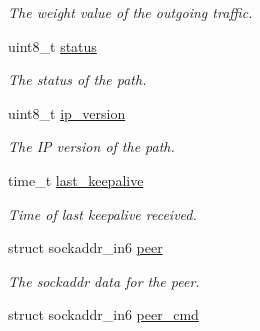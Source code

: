 \begin{DoxyCompactItemize}
\begin{DoxyCompactList}\small\item\em The weight value of the outgoing traffic. \end{DoxyCompactList}\item 
\hypertarget{structpath__struct_ade818037fd6c985038ff29656089758d}{uint8\-\_\-t \hyperlink{structpath__struct_ade818037fd6c985038ff29656089758d}{status}}\label{structpath__struct_ade818037fd6c985038ff29656089758d}

\begin{DoxyCompactList}\small\item\em The status of the path. \end{DoxyCompactList}\item 
\hypertarget{structpath__struct_a8d5dab544aa6ca6d812e1676857b7545}{uint8\-\_\-t \hyperlink{structpath__struct_a8d5dab544aa6ca6d812e1676857b7545}{ip\-\_\-version}}\label{structpath__struct_a8d5dab544aa6ca6d812e1676857b7545}

\begin{DoxyCompactList}\small\item\em The I\-P version of the path. \end{DoxyCompactList}\item 
\hypertarget{structpath__struct_abdffb7370190bb4e10bd049ffa20dfb8}{time\-\_\-t \hyperlink{structpath__struct_abdffb7370190bb4e10bd049ffa20dfb8}{last\-\_\-keepalive}}\label{structpath__struct_abdffb7370190bb4e10bd049ffa20dfb8}

\begin{DoxyCompactList}\small\item\em Time of last keepalive received. \end{DoxyCompactList}\item 
\hypertarget{structpath__struct_a482c5e52f29bbc6839cb9a95b7b2aa4c}{struct sockaddr\-\_\-in6 \hyperlink{structpath__struct_a482c5e52f29bbc6839cb9a95b7b2aa4c}{peer}}\label{structpath__struct_a482c5e52f29bbc6839cb9a95b7b2aa4c}

\begin{DoxyCompactList}\small\item\em The sockaddr data for the peer. \end{DoxyCompactList}\item 
\hypertarget{structpath__struct_a5e5a7b214adf4c89592e8ea193840bfb}{struct sockaddr\-\_\-in6 \hyperlink{structpath__struct_a5e5a7b214adf4c89592e8ea193840bfb}{peer\-\_\-cmd}}\label{structpath__struct_a5e5a7b214adf4c89592e8ea193840bfb}


\end{DoxyCompactItemize}
